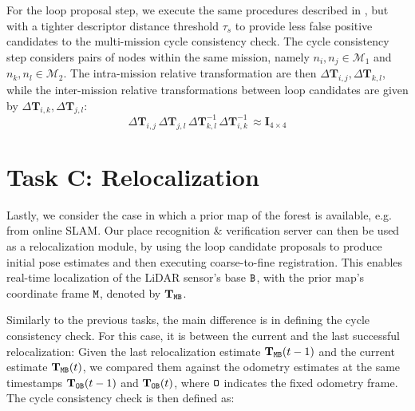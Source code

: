 For the loop proposal step, we execute the same procedures described in , but with a tighter descriptor distance threshold $\tau_{s}$ to provide less false positive candidates to the multi-mission cycle consistency check.
The cycle consistency step considers pairs of nodes within the same mission, namely $n_i, n_j \in \mathcal{M}_1$ and $n_k, n_l \in \mathcal{M}_2$. The intra-mission relative transformation are then $\Delta\mathbf{T}_{i,j}, \Delta\mathbf{T}_{k, l}$, while the inter-mission relative transformations between loop candidates are given by $\Delta\mathbf{T}_{i,k}, \Delta\mathbf{T}_{j,l}$:
\begin{equation}
  \label{eq:cycle-offline}
  \Delta\mathbf{T}_{i,j}\, \Delta\mathbf{T}_{j,l}\, \Delta\mathbf{T}_{k, l}^{-1}\, \Delta\mathbf{T}_{i,k}^{-1}\, \approx \mathbf{I}_{4\times4}
\end{equation}

\section{Task C: Relocalization} \label{sec:relocalization}
Lastly, we consider the case in which a prior map of the forest is available, e.g. from online SLAM. Our place recognition \& verification server can then be used as a relocalization module, by using the loop candidate proposals to produce initial pose estimates and then executing coarse-to-fine registration. This enables real-time localization of the LiDAR sensor's base $\mathtt{B}$, with the prior map's coordinate frame $\mathtt{M}$, denoted by $\mathbf{T}_{\mathtt{M}\mathtt{B}}$.

Similarly to the previous tasks, the main difference is in defining the cycle consistency check. For this case, it is between the current and the last successful relocalization: Given the last relocalization estimate $\mathbf{T}_{\mathtt{M}\mathtt{B}}(t-1)$ and the current estimate $\mathbf{T}_{\mathtt{M}\mathtt{B}}(t)$, we compared them against the odometry estimates at the same timestamps $\mathbf{T}_{\mathtt{O}\mathtt{B}}(t-1)$ and $\mathbf{T}_{\mathtt{O}\mathtt{B}}(t)$, where $\mathtt{O}$ indicates the fixed odometry frame. The cycle consistency check is then defined as:

